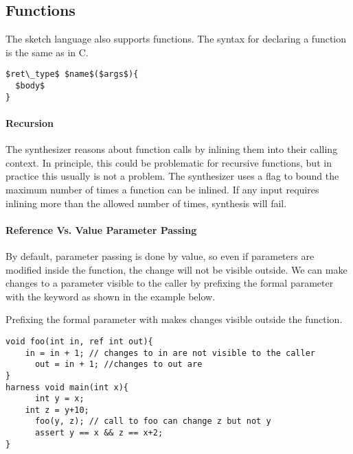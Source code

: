 \subsection{Functions}
The sketch language also supports functions. The syntax for declaring a function is the same as in C. 

\begin{lstlisting}
$ret\_type$ $name$($args$){
  $body$
}
\end{lstlisting}

\paragraph{Recursion}
The synthesizer reasons about function calls by inlining them into their calling context. In principle, this could be problematic for recursive functions, but in practice this usually is not a problem. The synthesizer uses a flag  to bound the maximum number of times a function can be inlined. If any input requires inlining more than the allowed number of times, synthesis will fail.




\paragraph{Reference Vs. Value Parameter Passing}
By default, parameter passing is done by value, so even if parameters are modified inside the function, the change will not be visible outside. We can make changes to a parameter visible to the caller by prefixing the formal parameter with the keyword  as shown in the example below.

\begin{Example}
Prefixing the formal parameter with  makes changes visible outside the function.
\begin{lstlisting}
void foo(int in, ref int out){
	in = in + 1; // changes to in are not visible to the caller
      out = in + 1; //changes to out are 
}
harness void main(int x){
      int y = x;
	int z = y+10;
      foo(y, z); // call to foo can change z but not y
      assert y == x && z == x+2;
}
\end{lstlisting}
\end{Example}

